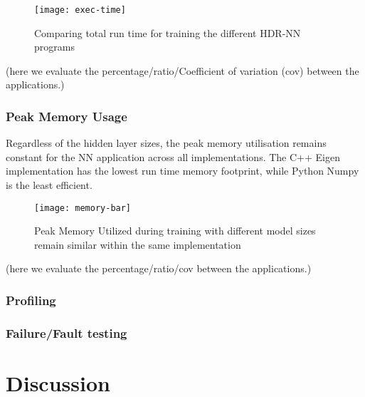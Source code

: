 \begin{figure}[ht]
	\centering
	\texttt{[image: exec-time]}
	\caption[Execution Time vs Model Parameters]{Comparing total run time for training the different HDR-NN programs}
\end{figure}

(here we evaluate the percentage/ratio/Coefficient of variation (cov) between the applications.)

\subsection{Peak Memory Usage}
Regardless of the hidden layer sizes, the peak memory utilisation remains constant for the NN application across all implementations. The C++ Eigen implementation has the lowest run time memory footprint, while Python Numpy is the least efficient.

\begin{figure}[ht]
	\centering
	\texttt{[image: memory-bar]}
	\caption[Peak Memory Utilisation]{Peak Memory Utilized during training with different model sizes remain similar within the same implementation}
\end{figure}

(here we evaluate the percentage/ratio/cov between the applications.)

\subsection{Profiling}

\subsection{Failure/Fault testing}

\chapter{Discussion}


